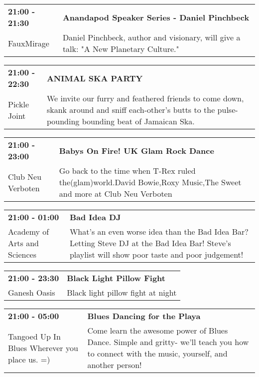 \begin{tabular}{ p{1in} p{2.2in} }
    \textbf{21:00 - 21:30} & \textbf{Anandapod Speaker Series - Daniel Pinchbeck} \\
    FauxMirage \newline  & Daniel Pinchbeck, author and visionary, will give a talk: "A New Planetary Culture." \\
    \hline 
\end{tabular}
    
\begin{tabular}{ p{1in} p{2.2in} }
    \textbf{21:00 - 22:30} & \textbf{ANIMAL SKA PARTY} \\
    Pickle Joint \newline  & We invite our furry and feathered friends to come down, skank around and sniff each-other's butts to the pulse-pounding bounding beat of Jamaican Ska. \\
    \hline 
\end{tabular}
    
\begin{tabular}{ p{1in} p{2.2in} }
    \textbf{21:00 - 23:00} & \textbf{Babys On Fire! UK Glam Rock Dance } \\
    Club Neu Verboten \newline  & Go back to the time when T-Rex ruled the(glam)world.David Bowie,Roxy Music,The Sweet and more at Club Neu Verboten \\
    \hline 
\end{tabular}
    
\begin{tabular}{ p{1in} p{2.2in} }
    \textbf{21:00 - 01:00} & \textbf{Bad Idea DJ} \\
    Academy of Arts and Sciences \newline  & What's an even worse idea than the Bad Idea Bar? Letting Steve DJ at the Bad Idea Bar! Steve's playlist will show poor taste and poor judgement! \\
    \hline 
\end{tabular}
    
\begin{tabular}{ p{1in} p{2.2in} }
    \textbf{21:00 - 23:30} & \textbf{Black Light Pillow Fight} \\
    Ganesh Oasis \newline  & Black light pillow fight at night \\
    \hline 
\end{tabular}
    
\begin{tabular}{ p{1in} p{2.2in} }
    \textbf{21:00 - 05:00} & \textbf{Blues Dancing for the Playa} \\
    Tangoed Up In Blues \newline Wherever you place us. =) & Come learn the awesome power of Blues Dance. Simple and gritty- we'll teach you how to connect with the music, yourself, and another person! \\
    \hline 
\end{tabular}
    
